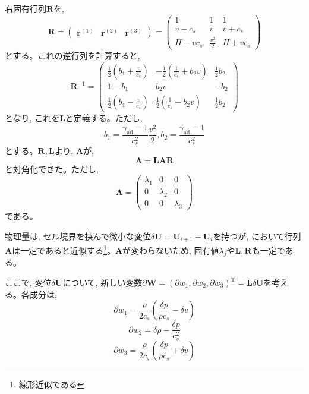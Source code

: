 \documentclass[dvipdfmx,b5paper]{jsarticle}
\begin{document}
右固有行列$\bm{R}$を, 
\begin{equation}
  \bm{R} = 
  \begin{pmatrix}
    \bm{r}^{(1)} & \bm{r}^{(2)} & \bm{r}^{(3)}
  \end{pmatrix}
  =
  \begin{pmatrix}
    1 & 1 & 1 \\
    v-c_s & v & v+c_s \\
    H-vc_s & \frac{v^2}{2} & H+vc_s
  \end{pmatrix}
\end{equation}
とする。これの逆行列を計算すると, 
\begin{equation}
  \bm{R}^{-1}=
  \begin{pmatrix}
    \frac{1}{2}\left(b_1+\frac{v}{c_s}\right) & -\frac{1}{2}\left(\frac{1}{c_s}+b_2v\right) & \frac{1}{2}b_2 \\
    1-b_1 & b_2v & -b_2 \\
    \frac{1}{2}\left(b_1-\frac{v}{c_s}\right) & \frac{1}{2}\left(\frac{1}{c_s}-b_2v\right) & \frac{1}{2}b_2
  \end{pmatrix}
\end{equation}
となり, これを$\bm{L}$と定義する。ただし, 
\begin{equation}
  b_1=\frac{\gamma_{\mathrm{ad}}-1}{c_s^2}\frac{v^2}{2}, b_2=\frac{\gamma_{\mathrm{ad}}-1}{c_s^2}
\end{equation}
とする。$\bm{R}, \bm{L}$より, $\bm{A}$が, 
\begin{equation}
  \bm{\Lambda}=\bm{LAR}
\end{equation}
と対角化できた。ただし, 
\begin{equation}
  \bm{\Lambda}=
  \begin{pmatrix}
    \lambda_1 & 0 & 0 \\
    0 & \lambda_2 & 0 \\
    0 & 0 & \lambda_3
  \end{pmatrix}
\end{equation}
である。

物理量は, セル境界を挟んで微小な変位$\delta \bm{U}=\bm{U}_{i+1}-\bm{U}_{i}$を持つが, において行列$\bm{A}$は一定であると近似する\footnote{線形近似である}。$\bm{A}$が変わらないため, 固有値$\lambda_j$や$\bm{L}, \bm{R}$も一定である。

ここで, 変位$\delta \bm{U}$について, 新しい変数$\partial \bm{W}=(\partial w_1, \partial w_2, \partial w_3)^{\mathrm{T}}=\bm{L}\delta\bm{U}$を考える。各成分は, 
\begin{equation}
  \partial w_1=\frac{\rho}{2c_s}\left(\frac{\delta p}{\rho c_s}-\delta v\right)
\end{equation}
\begin{equation}
  \partial w_2 = \delta \rho-\frac{\delta p}{c_s^2}
\end{equation}
\begin{equation}
  \partial w_3 = \frac{\rho}{2c_s}\left(\frac{\delta p}{\rho c_s}+\delta v\right)
\end{equation}
\end{document}
